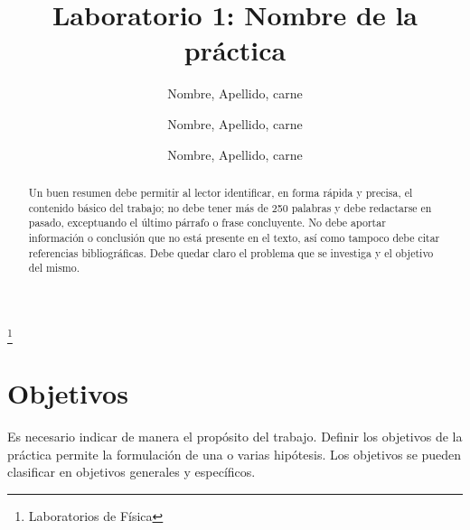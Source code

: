 \documentclass[osajnl,twocolumn,showpacs,superscriptaddress,10pt]{revtex4-1}
\begin{document}

\title{Laboratorio 1: Nombre de la práctica}
\thanks{Laboratorios de Física}

\author{Nombre, Apellido, carne}
%
\author{Nombre, Apellido, carne}
%
\author{Nombre, Apellido, carne}
%





\begin{abstract}

    Un buen resumen debe permitir al lector identificar, en forma rápida y precisa, el contenido básico del trabajo; no debe tener más de 250 palabras y debe redactarse en pasado, exceptuando el último párrafo o frase concluyente. No debe aportar información o conclusión que no está presente en el texto, así como tampoco debe citar referencias bibliográficas. Debe quedar claro el problema que se investiga y el objetivo del mismo.

\end{abstract}



\maketitle{}


\section{Objetivos}

    Es necesario indicar de manera el propósito del trabajo. Definir los objetivos de la práctica permite la formulación de una o varias hipótesis. Los objetivos se pueden clasificar en objetivos generales y específicos.
    
\end{document}
